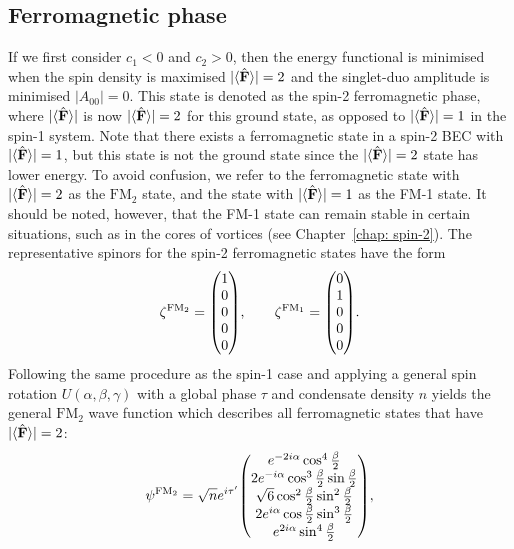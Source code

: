 \subsection{Ferromagnetic phase}
If we first consider \(c_1 < 0\) and \(c_2 > 0\), then the energy functional is
minimised when  the spin density is maximised \(|\langle \hat{\vb{F}} \rangle |=2\)
and the singlet-duo amplitude is minimised \(|A_{00}|=0\).
This state is denoted as the spin-2 ferromagnetic phase, where \(|\langle \hat{\vb{F}} \rangle | \) is
now \(|\langle \hat{\vb{F}} \rangle |=2\) for this ground state, as opposed to \(|\langle \hat{\vb{F}} \rangle |=1\) in the
spin-1 system.
Note that there exists a ferromagnetic state in a spin-2 BEC with
\(|\langle \hat{\vb{F}} \rangle |=1\), but this state is not the ground state since the \(|\langle \hat{\vb{F}} \rangle |=2\)
state has lower energy.
To avoid confusion, we refer to the ferromagnetic state with \(|\langle \hat{\vb{F}} \rangle |=2\) as
the \(\text{FM}_2\) state, and the state with \(|\langle \hat{\vb{F}} \rangle |=1\) as the FM-1 state.
It should be noted, however, that the FM-1 state can remain stable in
certain situations, such as in the cores of vortices (see
Chapter~\ref{chap: spin-2}).
The representative spinors for the spin-2 ferromagnetic states have the form
\begin{equation}\label{eq: FM2-FM1-spinors}
    \zeta^{\text{FM}_2} = \mqty(1 \\ 0 \\ 0 \\ 0 \\ 0), \qquad
    \zeta^{\text{FM}_1} = \mqty(0 \\ 1 \\ 0 \\ 0 \\ 0).
\end{equation}
Following the same procedure as the spin-1 case and applying a general spin
rotation \(U(\alpha, \beta, \gamma)\) with a global phase \(\tau \) and
condensate density \(n\) yields the general \(\text{FM}_2\) wave function which describes
all ferromagnetic states that have \(|\langle \hat{\vb{F}} \rangle |=2\):
\begin{equation}\label{eq: FM-2-representative-spinor}
    \psi^{\text{FM}_2} = \sqrt{n}e^{i\tau'}\mqty(
    e^{-2i\alpha} \cos^4\frac{\beta}{2} \\
    2e^{-i\alpha}\cos^3\frac{\beta}{2}\sin \frac{\beta}{2} \\
    \sqrt{6} \cos^2\frac{\beta}{2} \sin^2\frac{\beta}{2} \\
    2e^{i\alpha}\cos\frac{\beta}{2} \sin^3\frac{\beta}{2} \\
    e^{2i\alpha} \sin^4\frac{\beta}{2}
    ),
\end{equation}
